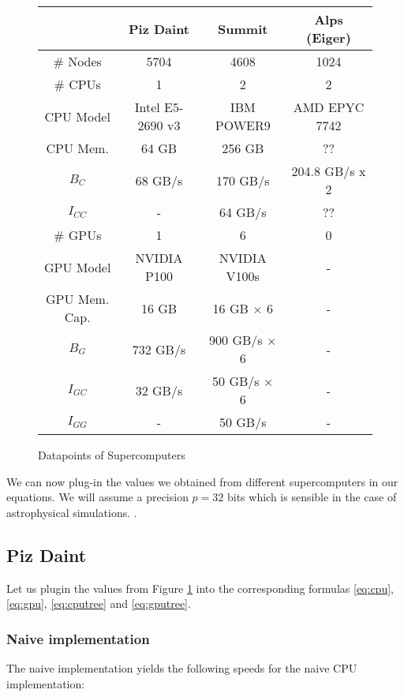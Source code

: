 \documentclass[]{article}
\begin{document}
\small
\begin{figure}[H]
	\begin{center}
		\begin{tabular}{ c c c c }
			& Piz Daint \cite{piz_daint} & Summit & Alps (Eiger) \\ 
			\hline
			\# Nodes & 5704 & 4608 & 1024\\
			\# CPUs & 1 & 2 & 2\\
			CPU Model & Intel E5-2690 v3 & IBM POWER9 & AMD EPYC 7742 \\
			CPU Mem. & 64 GB & 256 GB & ?? \\   
			$B_C$  & 68 GB/s & 170 GB/s & 204.8 GB/s x 2	\\
			$I_{CC}$ & - & 64 GB/s & ?? \\
			\# GPUs & 1 & 6 & 0 \\
			GPU Model & NVIDIA P100 & NVIDIA V100s & - \\
			GPU Mem. Cap. & 16 GB & 16 GB $\times$ 6 & -\\
			$B_G$ & 732 GB/s & 900 GB/s $\times$ 6 & -\\
			$I_{GC}$ & 32 GB/s & 50 GB/s $\times$ 6 & -\\
			$I_{GG}$ & - & 50 GB/s & -\\
		\end{tabular}
	\end{center}
\caption{Datapoints of Supercomputers}
\label{fig:datapoints}
\end{figure}

We can now plug-in the values we obtained from different supercomputers in our equations.  We will assume a precision $p = 32$ bits which is sensible in the case of astrophysical simulations. .

\def\s{12}
\def\d{8096}
\def\p{32}

\normalfont
\subsection{Piz Daint} 

Let us plugin the values from Figure \ref{fig:datapoints} into the corresponding formulas \ref{eq:cpu}, \ref{eq:gpu}, \ref{eq:cputree} and \ref{eq:gputree}.

\subsubsection{Naive implementation}
The naive implementation yields the following speeds for the naive CPU  implementation:
\end{document}
